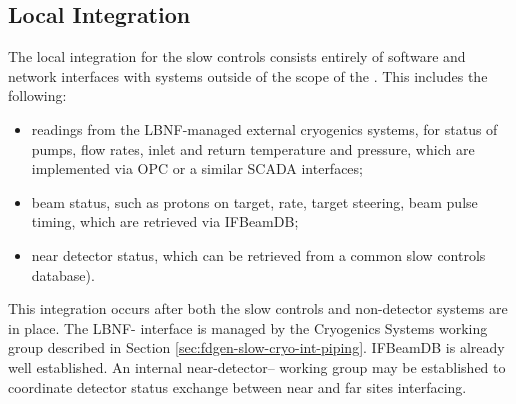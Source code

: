 \subsection{Local Integration}
\label{sec:fdgen-slow-cryo-slow-loc-integ}


The local integration for the slow controls consists entirely of software
and network interfaces with systems outside of the scope of the .
This includes the following:
\begin{itemize}
\item readings from the LBNF-managed external cryogenics systems, for status of pumps, flow rates, inlet and return temperature and pressure, which are implemented via OPC or a similar SCADA interfaces;
\item beam status, such as protons on target, rate, target steering, beam pulse timing, which are retrieved via IFBeamDB;
\item near detector status, which can be retrieved from a common slow controls database).
\end{itemize}

This integration occurs after both the slow controls and non-detector
systems are in place.  The LBNF- interface is managed by the
Cryogenics Systems working group described in Section
\ref{sec:fdgen-slow-cryo-int-piping}.  IFBeamDB is already well established.
An internal near-detector-- working group may be established
to coordinate detector status exchange between near and far sites interfacing.



%
%  
%  

%
%  

